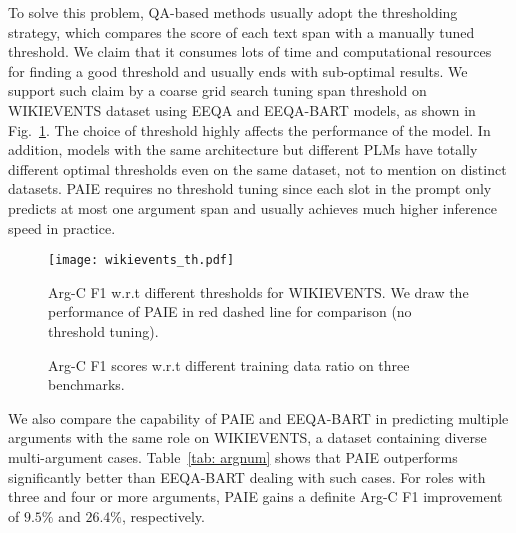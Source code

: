  To solve this problem, QA-based methods usually adopt the thresholding strategy, which compares the score of each text span with a manually tuned threshold. We claim that it consumes lots of time and computational resources for finding a good threshold and usually ends with sub-optimal results. We support such claim by a coarse grid search tuning span threshold on WIKIEVENTS dataset using EEQA and EEQA-BART models, as shown in Fig.~\ref{th_tuning}. The choice of threshold highly affects the performance of the model. In addition, models with the same architecture but different PLMs have totally different optimal thresholds even on the same dataset, not to mention on distinct datasets. PAIE requires no threshold tuning since each slot in the prompt only predicts at most one argument span and usually achieves much higher inference speed in practice.   
\begin{figure}[t]
\centering
\texttt{[image: wikievents\_th.pdf]}
\caption{Arg-C F1 w.r.t different thresholds for WIKIEVENTS. We draw the performance of PAIE in red dashed line for comparison (no threshold tuning).
}
\label{th_tuning}
\end{figure}

\begin{figure*}[htbp]
\centering
{}%
%
%
\caption{Arg-C F1 scores w.r.t different training data ratio on three benchmarks.}
\label{fig:fewshot}
\end{figure*}

 We also compare the capability of PAIE and EEQA-BART in predicting multiple arguments with the same role on WIKIEVENTS, a dataset containing diverse multi-argument cases. Table~\ref{tab: argnum} shows that PAIE outperforms significantly better than EEQA-BART dealing with such cases. For roles with three and four or more arguments, PAIE gains a definite Arg-C F1 improvement of $9.5\%$ and $26.4\%$, respectively.


